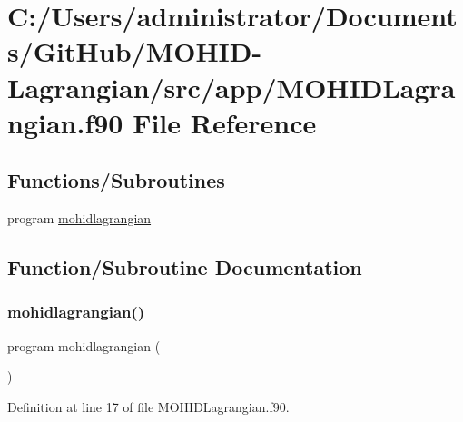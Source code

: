 \hypertarget{_m_o_h_i_d_lagrangian_8f90}{}\section{C\+:/\+Users/administrator/\+Documents/\+Git\+Hub/\+M\+O\+H\+I\+D-\/\+Lagrangian/src/app/\+M\+O\+H\+I\+D\+Lagrangian.f90 File Reference}
\label{_m_o_h_i_d_lagrangian_8f90}
\subsection*{Functions/\+Subroutines}
\begin{DoxyCompactItemize}
\item 
program \mbox{\hyperlink{_m_o_h_i_d_lagrangian_8f90_afb8cd544871a8dba29f3eac2f03477d2}{mohidlagrangian}}
\end{DoxyCompactItemize}


\subsection{Function/\+Subroutine Documentation}
\mbox{\label{_m_o_h_i_d_lagrangian_8f90_afb8cd544871a8dba29f3eac2f03477d2}} 
\subsubsection{\texorpdfstring{mohidlagrangian()}{mohidlagrangian()}}
{\footnotesize\ttfamily program mohidlagrangian (\begin{DoxyParamCaption}{ }\end{DoxyParamCaption})}



Definition at line 17 of file M\+O\+H\+I\+D\+Lagrangian.\+f90.

